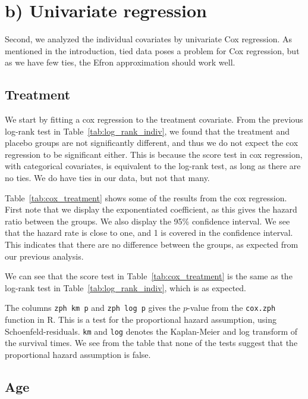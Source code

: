 \documentclass[11pt,a4paper]{article}
\begin{document}
\section{b) Univariate regression}

Second, we analyzed the individual covariates by univariate Cox regression.
As mentioned in the introduction, tied data poses a problem for Cox regression, but as we have few ties, the Efron approximation should work well.

\subsection{Treatment}

We start by fitting a cox regression to the treatment covariate. From the previous log-rank test in Table~\ref{tab:log_rank_indiv}, we found that the treatment and placebo groups are not significantly different, and thus we do not expect the cox regression to be significant either. This is because the score test in cox regression, with categorical covariates, is equivalent to the log-rank test, as long as there are no ties. We do have ties in our data, but not that many.

Table~\ref{tab:cox_treatment} shows some of the results from the cox regression. First note that we display the exponentiated coefficient, as this gives the hazard ratio between the groups. We also display the 95\% confidence interval. We see that the hazard rate is close to one, and 1 is covered in the confidence interval. This indicates that there are no difference between the groups, as expected from our previous analysis.

We can see that the score test in Table~\ref{tab:cox_treatment} is the same as the log-rank test in Table~\ref{tab:log_rank_indiv}, which is as expected.

The columns \verb+zph km p+ and \verb+zph log p+ gives the $p$-value from the \verb+cox.zph+ function in R. This is a test for the proportional hazard assumption, using Schoenfeld-residuals. \verb+km+ and \verb+log+ denotes the Kaplan-Meier and log transform of the survival times. We see from the table that none of the tests suggest that the proportional hazard assumption is false.



\subsection{Age}
\end{document}
